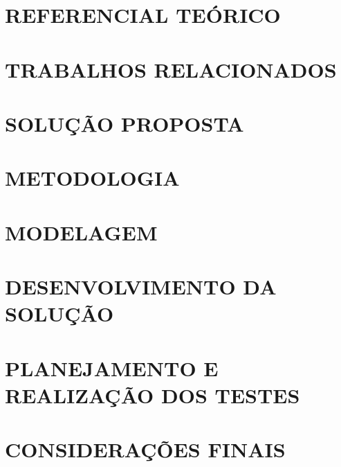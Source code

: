 \documentclass[
        oneside,      %
        english,
        brazil
        ]{configcefetmglpd}
\begin{document}
\chapter{REFERENCIAL TEÓRICO} \label{cap:referencial}


\chapter{TRABALHOS RELACIONADOS} \label{cap:trabalhos-relacionados}\label{sec:trabalhos-relacionados}


\chapter{SOLUÇÃO PROPOSTA} \label{cap:proposta}


\chapter{METODOLOGIA} \label{cap:metodologia}


\chapter{MODELAGEM} \label{cap:modelagem}


\chapter{DESENVOLVIMENTO DA SOLUÇÃO} \label{cap:desenvolvimento}


\chapter{PLANEJAMENTO E REALIZAÇÃO DOS TESTES} \label{cap:testes}\label{sec:testes-plataforma}





\chapter{CONSIDERAÇÕES FINAIS} \label{cap:consideracoes}



\postextual



\appendix

\end{document}
